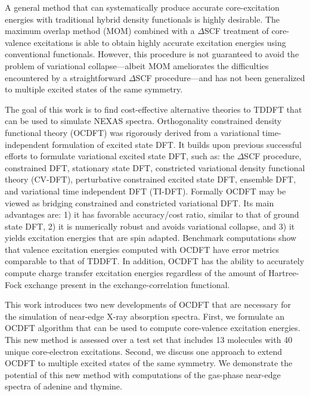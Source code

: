 \documentclass[12pt]{article}
\begin{document}
A general method that can systematically produce accurate core-excitation energies with traditional hybrid density functionals is highly desirable. The maximum overlap method (MOM) \cite{besley_self-consistent-field_2009} combined with a $\Delta$SCF treatment of core-valence excitations is able to obtain highly accurate excitation energies using conventional functionals. However, this procedure is not guaranteed to avoid the problem of variational collapse---albeit MOM ameliorates the difficulties encountered by a straightforward $\Delta$SCF procedure---and has not been generalized to multiple excited states of the same symmetry.

The goal of this work is to find cost-effective alternative theories to TDDFT that can be used to simulate NEXAS spectra.
Orthogonality constrained density functional theory (OCDFT)\cite{evangelista_orthogonality_2013}  was rigorously derived from a variational time-independent formulation of excited state DFT.
It builds upon previous successful efforts to formulate variational excited state DFT, such as: the $\Delta$SCF procedure, \cite{kowalczyk_assessment_2011,ziegler_calculation_1977} constrained DFT,\cite{wu_constrained_2006} stationary state DFT, \cite{gorling_density-functional_1999}  constricted variational density functional theory (CV-DFT), \cite{ziegler_relation_2009,ziegler_application_2011,krykunov_self-consistent_2013,ziegler_implementation_2012}
perturbative constrained excited state DFT,\cite{baruah_dft_2009,olguin_effect_2013,zope_charge_2012} ensemble DFT,\cite{theophilou_energy_1979,fritsche_generalized_1986,gross_rayleigh-ritz_1988,gross_density-functional_1988} and variational time independent DFT (TI-DFT). \cite{levy_variational_1999,nagy_variational_2001}
Formally OCDFT may be viewed as bridging constrained and constricted variational DFT.  Its main advantages are: 1) it has favorable accuracy/cost ratio, similar to that of ground state DFT, 2) it is numerically robust and avoids variational collapse, and 3) it yields excitation energies that are spin adapted.
Benchmark computations\cite{evangelista_orthogonality_2013} show that valence excitation energies computed with OCDFT have error metrics comparable to that of TDDFT.  In addition, OCDFT has the ability to accurately compute charge transfer excitation energies regardless of the amount of Hartree-Fock exchange present in the exchange-correlation functional.

This work introduces two new developments of OCDFT that are necessary for the simulation of near-edge X-ray  absorption spectra.
First, we formulate an OCDFT algorithm that can be used to compute core-valence excitation energies.  This new method is assessed over a test set that includes 13 molecules with 40 unique core-electron excitations.
Second, we discuss one approach to extend OCDFT to multiple excited states of the same symmetry.
We demonstrate the potential of this new method with computations of the gas-phase near-edge spectra of adenine and thymine.
\end{document}
